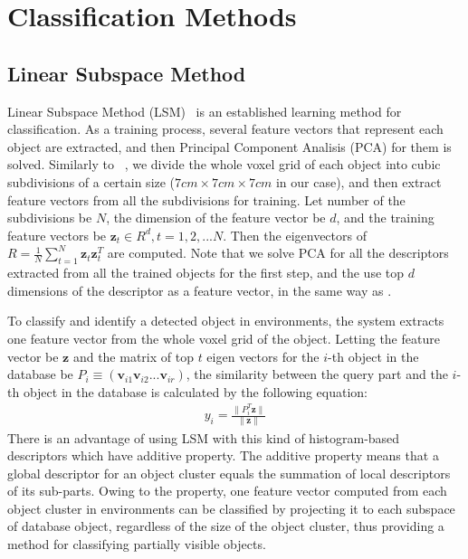 \documentclass[conference]{sty/IEEEtran}
\begin{document}
\section{Classification Methods}
\label{sec:classification}

\subsection{Linear Subspace Method}
\label{sec:subspace}
Linear Subspace Method (LSM)~\cite{watanabe1973} is an established learning method for classification. 
As a training process, several feature vectors that represent each object are extracted, 
and then Principal Component Analisis (PCA) for them is solved. 
Similarly to ~\cite{kanezaki2010icra}, we divide the whole voxel grid of each object into 
cubic subdivisions of a certain size ($7cm\times7cm\times7cm$ in our case), and then extract feature vectors from all the subdivisions for training. 
Let number of the subdivisions be $N$, the dimension of the feature vector be $d$, 
and the training feature vectors be $\bm{z}_t \in R^d, t=1,2,...N$. 
Then the eigenvectors of $R=\frac{1}{N} \sum^{N}_{t=1} \bm{z}_t \bm{z}_t^T$ are computed. 
Note that we solve PCA for all the descriptors extracted from all the trained objects for the first step, 
and the use top $d$ dimensions of the descriptor as a feature vector, in the same way as \cite{kanezaki2010icra}.

To classify and identify a detected object in environments, the system extracts one feature vector from the whole voxel grid of the object. 
Letting the feature vector be $\bm{z}$ and the matrix of top $t$ eigen vectors for the $i$-th object in the database be $P_i \equiv (\bm{v}_{i1} \bm{v}_{i2} ... \bm{v}_{ir})$,
the similarity between the query part and the $i$-th object in the database is calculated by the following equation:
\begin{eqnarray}\label{eq:y_calc}
  y_i = \frac{\| P_i^T \bm{z} \|}{\| \bm{z} \|}
\end{eqnarray}
There is an advantage of using LSM with this kind of histogram-based descriptors which have additive property. 
The additive property means that a global descriptor for an object cluster equals the summation of local descriptors of its sub-parts. 
Owing to the property, one feature vector computed from each object cluster in environments can be classified by projecting it to 
each subspace of database object, regardless of the size of the object cluster, thus providing a method for classifying partially visible objects.
\end{document}
